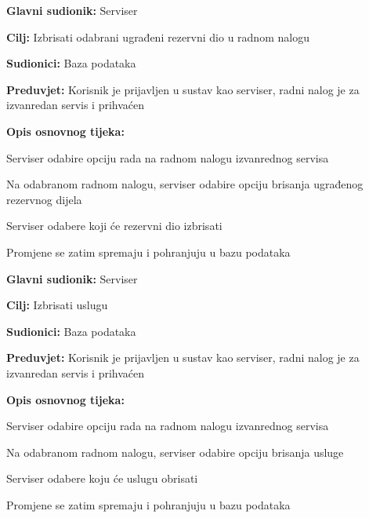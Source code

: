\noindent {}
\begin{packed_item}

	\item \textbf{Glavni sudionik: } Serviser
	\item  \textbf{Cilj:} Izbrisati odabrani ugrađeni rezervni dio u radnom nalogu
	\item  \textbf{Sudionici:} Baza podataka
	\item  \textbf{Preduvjet:} Korisnik je prijavljen u sustav kao serviser, radni nalog je
	za izvanredan servis i prihvaćen
	\item  \textbf{Opis osnovnog tijeka:}

	\item[] \begin{packed_enum}

		\item Serviser odabire opciju rada na radnom nalogu izvanrednog servisa
		\item Na odabranom radnom nalogu, serviser odabire opciju brisanja ugrađenog rezervnog dijela
		\item Serviser odabere koji će rezervni dio izbrisati
		\item Promjene se zatim spremaju i pohranjuju u bazu podataka

	\end{packed_enum}
\end{packed_item}

\noindent {}
\begin{packed_item}

	\item \textbf{Glavni sudionik: } Serviser
	\item  \textbf{Cilj:} Izbrisati uslugu
	\item  \textbf{Sudionici:} Baza podataka
	\item  \textbf{Preduvjet:} Korisnik je prijavljen u sustav kao serviser, radni nalog je
	za izvanredan servis i prihvaćen
	\item  \textbf{Opis osnovnog tijeka:}

	\item[] \begin{packed_enum}

		\item Serviser odabire opciju rada na radnom nalogu izvanrednog servisa
		\item Na odabranom radnom nalogu, serviser odabire opciju brisanja usluge
		\item Serviser odabere koju će uslugu obrisati
		\item Promjene se zatim spremaju i pohranjuju u bazu podataka

	\end{packed_enum}
\end{packed_item}

